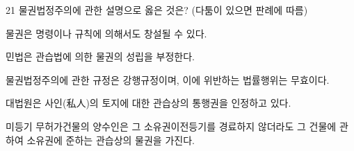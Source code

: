 \begin{question}{21}
물권법정주의에 관한 설명으로 옳은 것은? (다툼이 있으면 판례에 따름)
\begin{choices}
  \item 물권은 명령이나 규칙에 의해서도 창설될 수 있다.
  \item 민법은 관습법에 의한 물권의 성립을 부정한다.
  \item 물권법정주의에 관한 규정은 강행규정이며, 이에 위반하는 법률행위는 무효이다.
  \item 대법원은 사인(私人)의 토지에 대한 관습상의 통행권을 인정하고 있다.
  \item 미등기 무허가건물의 양수인은 그 소유권이전등기를 경료하지 않더라도 그 건물에 관하여 소유권에 준하는 관습상의 물권을 가진다.
\end{choices}
\end{question}
